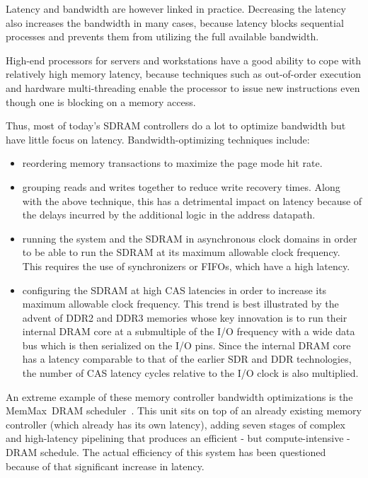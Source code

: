 \documentclass[a4paper,11pt]{kthesis}
\begin{document}
Latency and bandwidth are however linked in practice. Decreasing the latency also increases the bandwidth in many cases, because latency blocks sequential processes and prevents them from utilizing the full available bandwidth.

High-end processors for servers and workstations have a good ability to cope with relatively high memory latency, because techniques such as out-of-order execution and hardware multi-threading enable the processor to issue new instructions even though one is blocking on a memory access.

Thus, most of today's SDRAM controllers do a lot to optimize bandwidth but have little focus on latency. Bandwidth-optimizing techniques include:
\begin{itemize}
\item reordering memory transactions to maximize the page mode hit rate.
\item grouping reads and writes together to reduce write recovery times. Along with the above technique, this has a detrimental impact on latency because of the delays incurred by the additional logic in the address datapath.
\item running the system and the SDRAM in asynchronous clock domains in order to be able to run the SDRAM at its maximum allowable clock frequency. This requires the use of synchronizers or FIFOs, which have a high latency.
\item configuring the SDRAM at high CAS latencies in order to increase its maximum allowable clock frequency. This trend is best illustrated by the advent of DDR2 and DDR3 memories whose key innovation is to run their internal DRAM core at a submultiple of the I/O frequency with a wide data bus which is then serialized on the I/O pins. Since the internal DRAM core has a latency comparable to that of the earlier SDR and DDR technologies, the number of CAS latency cycles relative to the I/O clock is also multiplied.
\end{itemize}

An extreme example of these memory controller bandwidth optimizations is the MemMax\textregistered ~DRAM scheduler~\cite{memmax}. This unit sits on top of an already existing memory controller (which already has its own latency), adding seven stages of complex and high-latency pipelining that produces an efficient - but compute-intensive - DRAM schedule. The actual efficiency of this system has been questioned~\cite{dramqos} because of that significant increase in latency.
\end{document}
